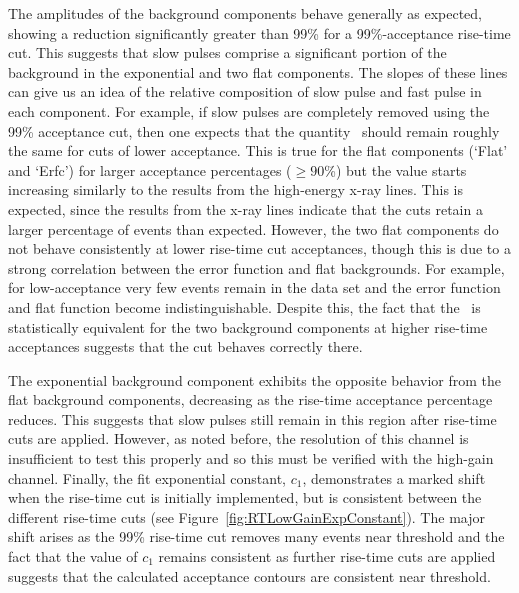 The amplitudes of the background components behave generally as expected, showing a reduction significantly greater than 99\% for a 99\%-acceptance rise-time cut.  This suggests that slow pulses comprise a significant portion of the background in the exponential and two flat components.  The slopes of these lines can give us an idea of the relative composition of slow pulse and fast pulse in each component.  For example, if slow pulses are completely removed using the 99\% acceptance cut, then one expects that the quantity \releff~should remain roughly the same for cuts of lower acceptance. This is true for the flat components (`Flat' and `Erfc') for larger acceptance percentages ($\ge90$\%) but the value starts increasing similarly to the results from the high-energy x-ray lines.  This is expected, since the results from the x-ray lines indicate that the cuts retain a larger percentage of events than expected.  However, the two flat components do not behave consistently at lower rise-time cut acceptances, though this is due to a strong correlation between the error function and flat backgrounds.  For example, for low-acceptance very few events remain in the data set and the error function and flat function become indistinguishable.  Despite this, the fact that the \releff~is statistically equivalent for the two background components at higher rise-time acceptances suggests that the cut behaves correctly there.  

The exponential background component exhibits the opposite behavior from the flat background components, decreasing as the rise-time acceptance percentage reduces.  This suggests that slow pulses still remain in this region after rise-time cuts are applied.  However, as noted before, the resolution of this channel is insufficient to test this properly and so this must be verified with the high-gain channel.  Finally, the fit exponential constant, $c_{1}$, demonstrates a marked shift when the rise-time cut is initially implemented, but is consistent between the different rise-time cuts (see Figure~\ref{fig:RTLowGainExpConstant}).  The major shift arises as the 99\% rise-time cut removes many events near threshold and the fact that the value of $c_{1}$ remains consistent as further rise-time cuts are applied suggests that the calculated acceptance contours are consistent near threshold.  

